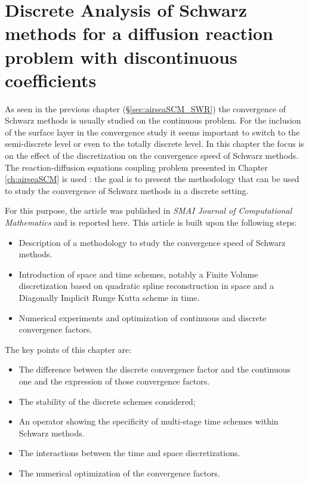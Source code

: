 \chapter{Discrete Analysis of Schwarz methods for a diffusion reaction problem with discontinuous coefficients}
\label{ch:discreteSchwarzAnalysis}
\minitoc
As seen in the previous chapter (\S \ref{sec:airseaSCM_SWR})
the convergence of Schwarz methods is usually studied on the
continuous problem. For the inclusion of the surface layer
in the convergence study
it seems important to switch to the semi-discrete level or even
to the totally discrete level.
In this chapter the focus is on the effect of the discretization
on the convergence speed of Schwarz methods. The reaction-diffusion
equations coupling problem presented in
Chapter \ref{ch:airseaSCM} is used : the goal is
to present the methodology that can be used to study the convergence
of Schwarz methods in a discrete setting.
\par
For this purpose, the article
\citep{clement_discrete_2022-1} was published in
\textit{SMAI Journal of Computational Mathematics} and is reported
here.
This article is built upon the following steps:
\begin{itemize}
	\item Description of a methodology to study the convergence
	speed of Schwarz methods.
	\item Introduction of space and time schemes,
		notably a Finite Volume discretization based
	on quadratic spline reconstruction in space and
		a Diagonally Implicit Runge Kutta scheme in time.
	\item Numerical experiments and optimization of continuous
		and discrete convergence factors.
\end{itemize}
The key points of this chapter are:
\begin{itemize}
	\item The difference between
	the discrete convergence factor and the continuous one
		and the expression of those convergence factors.
	\item The stability of the discrete schemes considered;
	\item An operator showing the specificity
	of multi-stage time schemes within Schwarz methods.
	\item The interactions between the time and space
		discretizations.
	\item The numerical optimization of the convergence factors.
\end{itemize}
